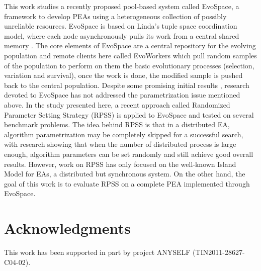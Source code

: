 \documentclass{llncs}
\begin{document}
This work studies a recently proposed pool-based system called EvoSpace, a framework to develop PEAs using 
a heterogeneous collection of possibly unreliable resources.
EvoSpace is based on Linda's tuple space coordination model, where each node asynchronously
pulls its work from a central shared memory  \cite{Evospace,Musart,FreeLunch,Fire}. The core elements of EvoSpace are a central 
repository for the evolving population and remote clients here called EvoWorkers
which pull random samples of the population to perform on them the basic evolutionary
processes (selection, variation and survival), once the work is done, the
modified sample is pushed back to the central population.
Despite some promising initial results \cite{Evospace,Musart,FreeLunch,Fire}, research devoted to EvoSpace has not addressed the parametrization issue mentioned above.
In the study presented here, a recent approach called Randomized Parameter Setting Strategy (RPSS) \cite{fuku1,fuku2} is applied to EvoSpace and tested on several
benchmark problems.
The idea behind RPSS is that in a distributed EA, algorithm parametrization may be completely skipped for a successful search,
with research showing that when the number of distributed process is large enough, algorithm parameters can be set randomly and still achieve
good overall results.
However, work on RPSS has only focused on the well-known Island Model for EAs, a distributed but synchronous system.
On the other hand, the goal of this work is to evaluate RPSS on a complete PEA implemented through EvoSpace.



\section{Acknowledgments}

This work has been supported in part by project ANYSELF
(TIN2011-28627-C04-02). 

%


\end{document}
